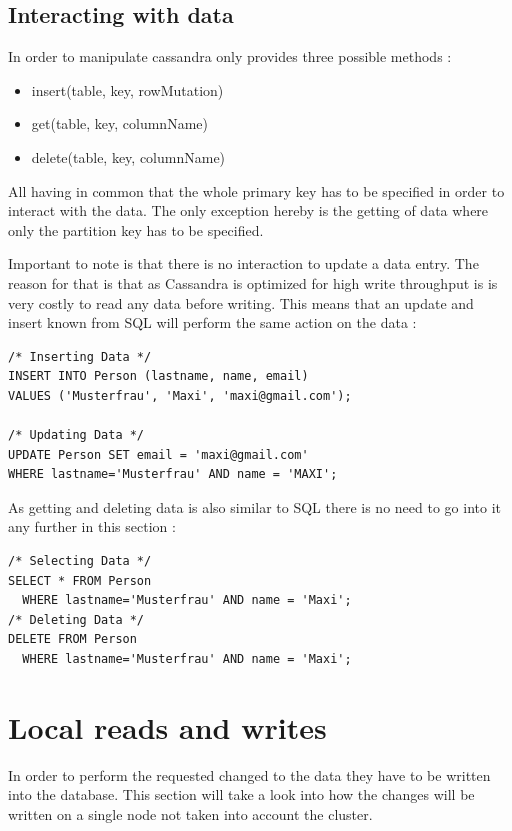 \subsection{Interacting with data}
In order to manipulate cassandra only provides three possible methods \autocite{cassandra_paper}:
\begin{itemize}
    \item insert(table, key, rowMutation)
    \item get(table, key, columnName)
    \item delete(table, key, columnName)
\end{itemize}
All having in common that the whole primary key has to be specified in order to interact with the data. The only exception hereby is the getting of data where only the partition key has to be specified.

Important to note is that there is no interaction to update a data entry. The reason for that is that as Cassandra is optimized for high write throughput is is very costly to read any data before writing. This means that an update and insert known from SQL will perform the same action on the data \autocite{cqlAlexMeng, newInCQL3}:
\begin{verbatim}
/* Inserting Data */
INSERT INTO Person (lastname, name, email)
VALUES ('Musterfrau', 'Maxi', 'maxi@gmail.com');

/* Updating Data */
UPDATE Person SET email = 'maxi@gmail.com'
WHERE lastname='Musterfrau' AND name = 'MAXI';
\end{verbatim}

As getting and deleting data is also similar to SQL there is no need to go into it any further in this section \autocite{cqlAlexMeng, cassandra3cqldocSelect}:
\begin{verbatim}
/* Selecting Data */
SELECT * FROM Person
  WHERE lastname='Musterfrau' AND name = 'Maxi';
/* Deleting Data */
DELETE FROM Person
  WHERE lastname='Musterfrau' AND name = 'Maxi';
\end{verbatim}

\section{Local reads and writes}
In order to perform the requested changed to the data they have to be written into the database. This section will take a look into how the changes will be written on a single node not taken into account the cluster.


